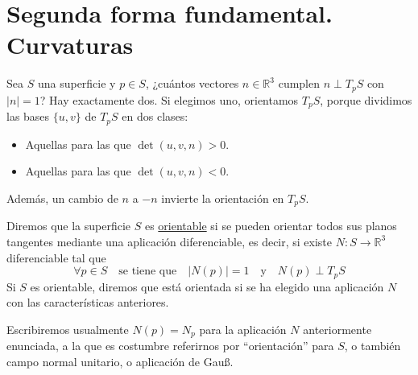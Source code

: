 \chapter{Segunda forma fundamental. Curvaturas}
\noindent
Sea $S$ una superficie y $p\in S$, ¿cuántos vectores $n\in \mathbb{R}^3$ cumplen $n\perp T_pS$ con $|n| = 1$? Hay exactamente dos. Si elegimos uno, orientamos $T_pS$, porque dividimos las bases $\{u,v\}$ de $T_pS$ en dos clases:
\begin{itemize}
    \item Aquellas para las que $\det(u,v,n)>0$.
    \item Aquellas para las que $\det(u,v,n)<0$.
\end{itemize}
Además, un cambio de $n$ a $-n$ invierte la orientación en $T_pS$.

\begin{definicion}
    Diremos que la superficie $S$ es \underline{orientable} si se pueden orientar todos sus planos tangentes mediante una aplicación diferenciable, es decir, si existe $N:S\to \mathbb{R}^3$ diferenciable tal que
    \begin{equation*}
        \forall p\in S \quad \text{se tiene que} \quad |N(p)| = 1 \quad \text{y}\quad   N(p)\perp T_pS
    \end{equation*}
    Si $S$ es orientable, diremos que está orientada si se ha elegido una aplicación $N$ con las características anteriores.
\end{definicion}

\begin{notacion}
    Escribiremos usualmente $N(p) = N_p$ para la aplicación $N$ anteriormente enunciada, a la que es costumbre referirnos por ``orientación'' para $S$, o también campo normal unitario, o aplicación de Gau\ss.
\end{notacion}

